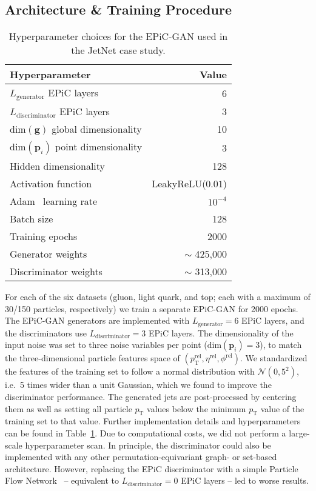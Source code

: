 \documentclass[a4paper,submission, Phys]{SciPost}
\DeclareRobustCommand{\Tab}[1]{Table~\ref{tab:#1}}
\begin{document}
\subsection{Architecture \& Training Procedure}
\label{sec:training}


\begin{table}[tbp]
\centering
\begin{tabular}{lr}
\hline
 Hyperparameter & Value \\
 \hline
 \hline
    $L_\mathrm{generator}$ EPiC layers  & 6 \\
    $L_\mathrm{discriminator}$ EPiC layers  & 3 \\
    $\text{dim}(\boldsymbol{g})$ global dimensionality  & 10 \\
    $\text{dim}(\boldsymbol{p}_i)$ point dimensionality  &  3 \\
    Hidden dimensionality & 128 \\
    Activation function & LeakyReLU($0.01$) \\
    Adam~\cite{Adam} learning rate & $10^{-4}$ \\
    Batch size &  128   \\
    Training epochs & 2000 \\
\hline
    Generator weights & $\sim$ 425,000 \\
    Discriminator weights & $\sim$ 313,000 \\
\hline
\end{tabular}
\caption{Hyperparameter choices for the EPiC-GAN used in the JetNet case study.}
\label{tab:hyperparameters}
\end{table}


For each of the six datasets (gluon, light quark, and top; each with a maximum of 30/150 particles, respectively) we train a separate EPiC-GAN for 2000 epochs. 
%
The EPiC-GAN generators are implemented with $L_\mathrm{generator} = 6$ EPiC layers, and the discriminators use $L_\mathrm{discriminator}=3$ EPiC layers.
%
The dimensionality of the input noise was set to three noise variables per point ($\text{dim}(\boldsymbol{p}_i)=3$), to match the three-dimensional particle features space of $(p_\mathrm{T}^\mathrm{rel},\eta^\mathrm{rel},\phi^\mathrm{rel})$.
%
We standardized the features of the training set to follow a normal distribution with $\mathcal{N}(0,5^2)$, i.e.~5 times wider than a unit Gaussian, which we found to improve the discriminator performance.
%
The generated jets are post-processed by centering them as well as setting all particle $p_\mathrm{T}$ values below the minimum $p_\mathrm{T}$ value of the training set to that value.
%
Further implementation details and hyperparameters can be found in \Tab{hyperparameters}.
%
Due to computational costs, we did not perform a large-scale hyperparameter scan. 
%
In principle, the discriminator could also be implemented with any other permutation-equivariant graph- or set-based architecture. 
%
However, replacing the EPiC discriminator with a simple Particle Flow Network~\cite{Komiske:2018cqr} -- equivalent to $L_\mathrm{discriminator}=0$ EPiC layers -- led to worse results.
%
\end{document}
